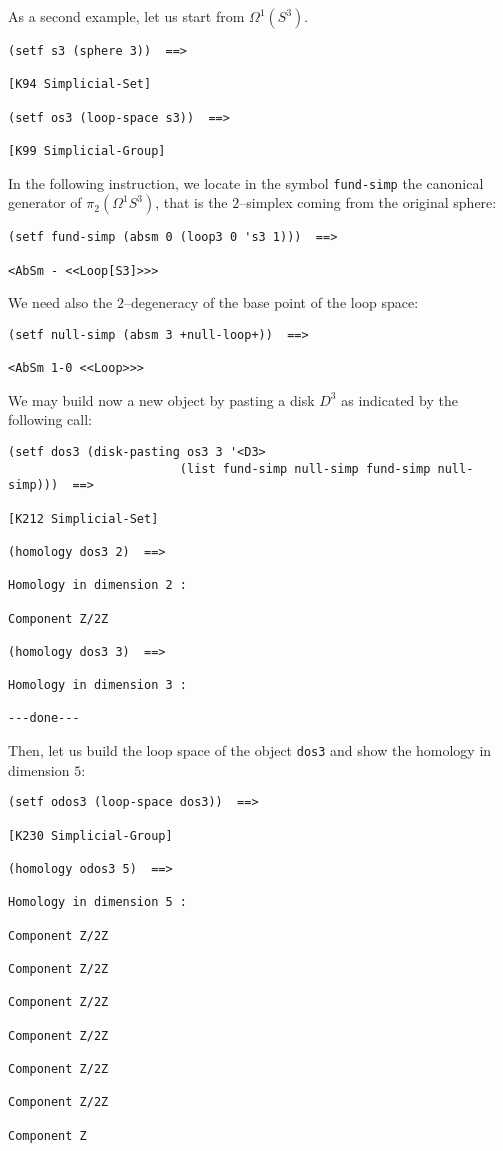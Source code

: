 As a second example, let us start from $\Omega^1(S^3)$.
{\footnotesize\begin{verbatim}
(setf s3 (sphere 3))  ==>

[K94 Simplicial-Set]

(setf os3 (loop-space s3))  ==>

[K99 Simplicial-Group]
\end{verbatim}}
In the following instruction, we locate in the symbol {\tt fund-simp} the canonical generator of 
$\pi_2 (\Omega^1S^3)$, that is the $2$--simplex coming from the original sphere:
{\footnotesize\begin{verbatim}
(setf fund-simp (absm 0 (loop3 0 's3 1)))  ==>

<AbSm - <<Loop[S3]>>>
\end{verbatim}}
We need also the $2$--degeneracy of the base point of the loop space:
{\footnotesize\begin{verbatim}
(setf null-simp (absm 3 +null-loop+))  ==>

<AbSm 1-0 <<Loop>>>
\end{verbatim}}
We may  build now a new  object by pasting a disk $D^3$ as indicated by the 
following call:
{\footnotesize\begin{verbatim}
(setf dos3 (disk-pasting os3 3 '<D3> 
                        (list fund-simp null-simp fund-simp null-simp)))  ==>

[K212 Simplicial-Set]

(homology dos3 2)  ==>

Homology in dimension 2 :

Component Z/2Z

(homology dos3 3)  ==>

Homology in dimension 3 :

---done---
\end{verbatim}}
Then, let us  build the  loop space of the object {\tt dos3} and show the ho\-mo\-lo\-gy
in dimension $5$:
{\footnotesize\begin{verbatim}
(setf odos3 (loop-space dos3))  ==>

[K230 Simplicial-Group]

(homology odos3 5)  ==>

Homology in dimension 5 :

Component Z/2Z

Component Z/2Z

Component Z/2Z

Component Z/2Z

Component Z/2Z

Component Z/2Z

Component Z
\end{verbatim}}

